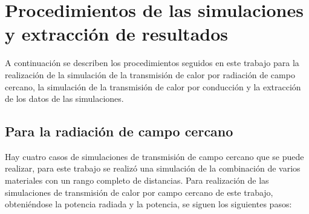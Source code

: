 \section{Procedimientos de las simulaciones y extracción de resultados}
A continuación se describen los procedimientos seguidos en este trabajo para la realización de la simulación de la transmisión de calor por radiación de campo cercano, la simulación de la transmisión de calor por conducción y la extracción de los datos de las simulaciones.\\
\subsection{Para la radiación de campo cercano}
Hay cuatro casos de simulaciones de transmisión de campo cercano que se puede realizar, para este trabajo se realizó una simulación de la combinación de varios materiales con un rango completo de distancias. Para realización de las simulaciones de transmisión de calor por campo cercano de este trabajo, obteniéndose la potencia radiada y la potencia, se siguen los siguientes pasos:
